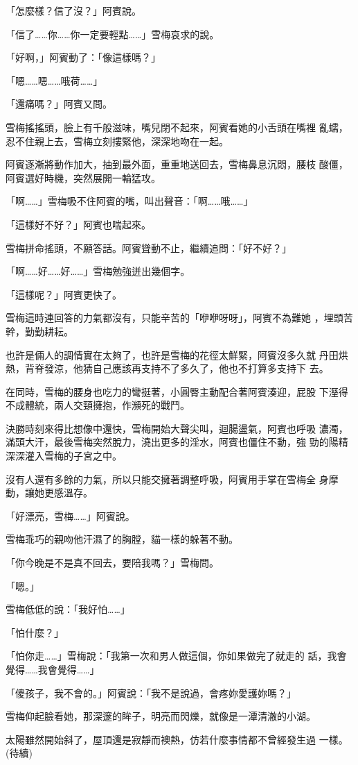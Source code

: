 「怎麼樣？信了沒？」阿賓說。

「信了……你……你一定要輕點……」雪梅哀求的說。

「好啊，」阿賓動了：「像這樣嗎？」

「嗯……嗯……哦荷……」

「還痛嗎？」阿賓又問。

雪梅搖搖頭，臉上有千般滋味，嘴兒閉不起來，阿賓看她的小舌頭在嘴裡
亂蠕，忍不住親上去，雪梅立刻摟緊他，深深地吻在一起。

阿賓逐漸將動作加大，抽到最外面，重重地送回去，雪梅鼻息沉悶，腰枝
酸僵，阿賓選好時機，突然展開一輪猛攻。

「啊……」雪梅吸不住阿賓的嘴，叫出聲音：「啊……哦……」

「這樣好不好？」阿賓也喘起來。

雪梅拼命搖頭，不願答話。阿賓聳動不止，繼續追問：「好不好？」

「啊……好……好……」雪梅勉強迸出幾個字。

「這樣呢？」阿賓更快了。

雪梅這時連回答的力氣都沒有，只能辛苦的「咿咿呀呀」，阿賓不為難她
，埋頭苦幹，勤勤耕耘。

也許是倆人的調情實在太夠了，也許是雪梅的花徑太鮮緊，阿賓沒多久就
丹田烘熱，背脊發涼，他猜自己應該再支持不了多久了，他也不打算多支持下
去。

在同時，雪梅的腰身也吃力的彎挺著，小圓臀主動配合著阿賓湊迎，屁股
下溼得不成體統，兩人交頸擁抱，作瀕死的戰鬥。

決勝時刻來得比想像中還快，雪梅開始大聲尖叫，迴腸盪氣，阿賓也呼吸
濃濁，滿頭大汗，最後雪梅突然脫力，澆出更多的淫水，阿賓也僵住不動，強
勁的陽精深深灌入雪梅的子宮之中。

沒有人還有多餘的力氣，所以只能交擁著調整呼吸，阿賓用手掌在雪梅全
身摩動，讓她更感溫存。

「好漂亮，雪梅……」阿賓說。

雪梅乖巧的親吻他汗濕了的胸膛，貓一樣的躲著不動。

「你今晚是不是真不回去，要陪我嗎？」雪梅問。

「嗯。」

雪梅低低的說：「我好怕……」

「怕什麼？」

「怕你走……」雪梅說：「我第一次和男人做這個，你如果做完了就走的
話，我會覺得……我會覺得……」

「傻孩子，我不會的。」阿賓說：「我不是說過，會疼妳愛護妳嗎？」

雪梅仰起臉看她，那深邃的眸子，明亮而閃爍，就像是一潭清澈的小湖。

太陽雖然開始斜了，屋頂還是寂靜而襖熱，仿若什麼事情都不曾經發生過
一樣。　
　
　
(待續)










